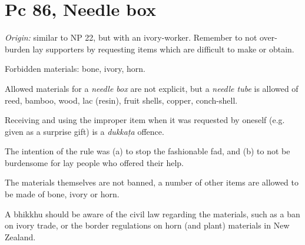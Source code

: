 \section{Pc 86, Needle box}

\emph{Origin:} similar to NP 22, but with an ivory-worker. Remember to
not over-burden lay supporters by requesting items which are difficult
to make or obtain.

Forbidden materials: bone, ivory, horn.

Allowed materials for a \emph{needle box} are not explicit, but a
\emph{needle tube} is allowed of reed, bamboo, wood, lac (resin), fruit
shells, copper, conch-shell.

Receiving and using the improper item when it was requested by oneself
(e.g. given as a surprise gift) is a \emph{dukkaṭa} offence.

The intention of the rule was (a) to stop the fashionable fad, and (b)
to not be burdensome for lay people who offered their help.

The materials themselves are not banned, a number of other items are
allowed to be made of bone, ivory or horn.

A bhikkhu should be aware of the civil law regarding the materials, such
as a ban on ivory trade, or the border regulations on horn (and plant)
materials in New Zealand.

